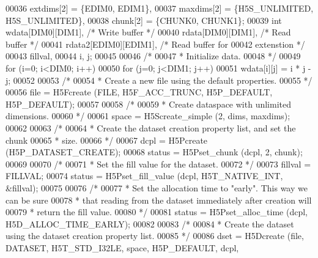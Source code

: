 \begin{DoxyCode}
00036                     extdims[2] = \{EDIM0, EDIM1\},
00037                     maxdims[2] = \{H5S\_UNLIMITED, H5S\_UNLIMITED\},
00038                     chunk[2] = \{CHUNK0, CHUNK1\};
00039     \textcolor{keywordtype}{int}             wdata[DIM0][DIM1],          \textcolor{comment}{/* Write buffer */}
00040                     rdata[DIM0][DIM1],          \textcolor{comment}{/* Read buffer */}
00041                     rdata2[EDIM0][EDIM1],       \textcolor{comment}{/* Read buffer for}
00042 \textcolor{comment}{                                                   extenstion */}
00043                     fillval,
00044                     i, j;
00045 
00046     \textcolor{comment}{/*}
00047 \textcolor{comment}{     * Initialize data.}
00048 \textcolor{comment}{     */}
00049     \textcolor{keywordflow}{for} (i=0; i<DIM0; i++)
00050         \textcolor{keywordflow}{for} (j=0; j<DIM1; j++)
00051             wdata[i][j] = i * j - j;
00052 
00053     \textcolor{comment}{/*}
00054 \textcolor{comment}{     * Create a new file using the default properties.}
00055 \textcolor{comment}{     */}
00056     file = H5Fcreate (FILE, H5F\_ACC\_TRUNC, H5P\_DEFAULT, H5P\_DEFAULT);
00057 
00058     \textcolor{comment}{/*}
00059 \textcolor{comment}{     * Create dataspace with unlimited dimensions.}
00060 \textcolor{comment}{     */}
00061     space = H5Screate\_simple (2, dims, maxdims);
00062 
00063     \textcolor{comment}{/*}
00064 \textcolor{comment}{     * Create the dataset creation property list, and set the chunk}
00065 \textcolor{comment}{     * size.}
00066 \textcolor{comment}{     */}
00067     dcpl = H5Pcreate (H5P\_DATASET\_CREATE);
00068     status = H5Pset\_chunk (dcpl, 2, chunk);
00069 
00070     \textcolor{comment}{/*}
00071 \textcolor{comment}{     * Set the fill value for the dataset.}
00072 \textcolor{comment}{     */}
00073     fillval = FILLVAL;
00074     status = H5Pset\_fill\_value (dcpl, H5T\_NATIVE\_INT, &fillval);
00075 
00076     \textcolor{comment}{/*}
00077 \textcolor{comment}{     * Set the allocation time to "early".  This way we can be sure}
00078 \textcolor{comment}{     * that reading from the dataset immediately after creation will}
00079 \textcolor{comment}{     * return the fill value.}
00080 \textcolor{comment}{     */}
00081     status = H5Pset\_alloc\_time (dcpl, H5D\_ALLOC\_TIME\_EARLY);
00082 
00083     \textcolor{comment}{/*}
00084 \textcolor{comment}{     * Create the dataset using the dataset creation property list.}
00085 \textcolor{comment}{     */}
00086     dset = H5Dcreate (file, DATASET, H5T\_STD\_I32LE, space, H5P\_DEFAULT, dcpl,

\end{DoxyCode}
